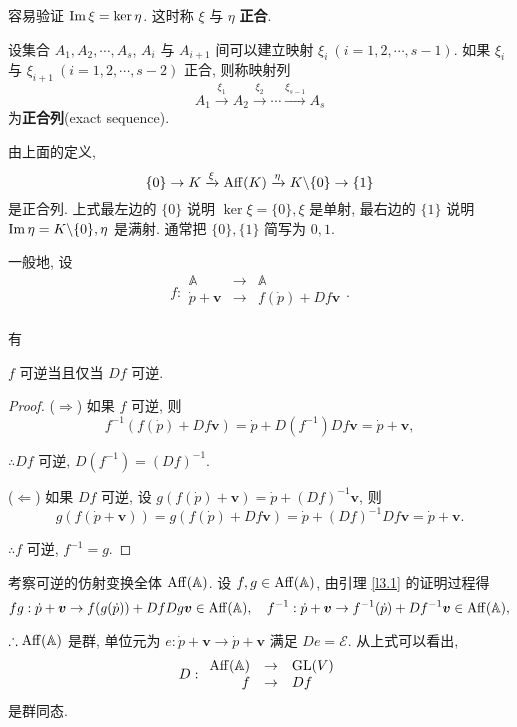 \documentclass[color=black,device=normal,lang=cn,mode=geye]{elegantnote}
\begin{document}
容易验证 $\operatorname{Im} \xi=\ker\eta$. 这时称 $\xi$ 与 $\eta$ \textbf{正合}.
\begin{definition}
    设集合 $A_1,A_2,\cdots,A_s$, $A_i$ 与 $A_{i+1}$ 间可以建立映射 $\xi_i\ (i=1,2,\cdots,s-1)$. 如果 $\xi_i$ 与 $\xi_{i+1}\ (i=1,2,\cdots,s-2)$ 正合, 则称映射列
    \[A_1\xrightarrow{\xi_1}A_2\xrightarrow{\xi_2}\cdots\xrightarrow{\xi_{s-1}}A_s\]
    为\textbf{正合列}(exact sequence).
\end{definition}
由上面的定义,
\[\{0\}\to K\xrightarrow{\xi}\operatorname{Aff} (K)\xrightarrow{\eta}K\backslash\{0\}\to\{1\}\]
是正合列. 上式最左边的 $\{0\}$ 说明 $\ker\xi=\{0\},\xi$ 是单射, 最右边的 $\{1\}$ 说明 $\operatorname{Im} \eta=K\backslash\{0\},\eta$ 是满射. 通常把 $\{0\},\{1\}$ 简写为 $0,1$.

一般地, 设
\[f:\begin{array}{rcl}
    \mathbb{A} & \to & \mathbb{A} \\
    \dot{p}+\boldsymbol{v} & \to & f(\dot{p})+Df\boldsymbol{v} \\
\end{array}.\]

有
\begin{lemma}\label{l3.1}
    $f$ 可逆当且仅当 $Df$ 可逆.
\end{lemma}
\begin{proof}
    ($\Rightarrow$) 如果 $f$ 可逆, 则
    \[f^{-1}(f(\dot{p})+Df\boldsymbol{v})=\dot{p}+D(f^{-1})Df\boldsymbol{v}=\dot{p}+\boldsymbol{v},\]

    $\therefore Df$ 可逆, $D(f^{-1})=(Df)^{-1}$.

    ($\Leftarrow$) 如果 $Df$ 可逆, 设 $g(f(\dot{p})+\boldsymbol{v})=\dot{p}+(Df)^{-1}\boldsymbol{v}$, 则
    \[g(f(\dot{p}+\boldsymbol{v}))=g(f(\dot{p})+Df\boldsymbol{v})=\dot{p}+(Df)^{-1}Df\boldsymbol{v}=\dot{p}+\boldsymbol{v}.\]

    $\therefore f$ 可逆, $f^{-1}=g$.
\end{proof}
考察可逆的仿射变换全体 $\operatorname{Aff} (\mathbb{A})$. 设 $f,g\in\operatorname{Aff} (\mathbb{A})$, 由引理 \ref{l3.1} 的证明过程得
\[fg:\dot{p}+\boldsymbol{v}\to f(g(\dot{p}))+DfDg\boldsymbol{v}\in\operatorname{Aff} (\mathbb{A}),\quad f^{-1}:\dot{p}+\boldsymbol{v}\to f^{-1}(\dot{p})+Df^{-1}\boldsymbol{v}\in\operatorname{Aff} (\mathbb{A}),\]

$\therefore\operatorname{Aff} (\mathbb{A})$ 是群, 单位元为 $e:\dot{p}+\boldsymbol{v}\to\dot{p}+\boldsymbol{v}$ 满足 $De=\mathcal{E}$. 从上式可以看出,
\[D:\begin{array}{rcl}
    \operatorname{Aff} (\mathbb{A}) & \to & \operatorname{GL} (V) \\
    f & \to & Df \\
\end{array}\]
是群同态.
\end{document}
